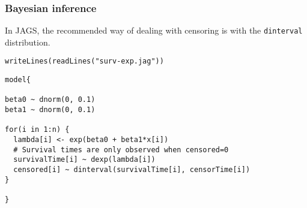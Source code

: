 \documentclass[color=usenames,dvipsnames]{beamer}\usepackage[]{graphicx}\usepackage[]{color}
\makeatletter
\newcommand{\hlstr}[1]{\textcolor[rgb]{0.749,0.012,0.012}{#1}}%
\newcommand{\hlstd}[1]{\textcolor[rgb]{0,0,0}{#1}}%
\newcommand{\hlkwd}[1]{\textcolor[rgb]{0.004,0.004,0.506}{#1}}%
\newenvironment{kframe}{%
 \def\at@end@of@kframe{}%
 \ifinner\ifhmode%
  \def\at@end@of@kframe{\end{minipage}}%
  \begin{minipage}{\columnwidth}%
 \fi\fi%
 \def\FrameCommand##1{\hskip\@totalleftmargin \hskip-\fboxsep
 \colorbox{shadecolor}{##1}\hskip-\fboxsep
     \hskip-\linewidth \hskip-\@totalleftmargin \hskip\columnwidth}%
 \MakeFramed {\advance\hsize-\width
   \@totalleftmargin\z@ \linewidth\hsize
   \@setminipage}}%
 {\par\unskip\endMakeFramed%
 \at@end@of@kframe}
\newenvironment{knitrout}{}{} %
\newcommand{\inr}[1]{\colorbox{inlinecolor}{\texttt{#1}}}
\makeatother
\begin{document}
\begin{frame}[fragile]
  \frametitle{Bayesian inference}
  In JAGS, the recommended way of dealing with censoring is with the
  \inr{dinterval} distribution. 
\begin{knitrout}
\color{fgcolor}\begin{kframe}
\begin{alltt}
\hlkwd{writeLines}\hlstd{(}\hlkwd{readLines}\hlstd{(}\hlstr{"surv-exp.jag"}\hlstd{))}
\end{alltt}
\end{kframe}
\end{knitrout}
\begin{knitrout}\footnotesize
{}\color{fgcolor}\begin{kframe}
\begin{verbatim}
model{

beta0 ~ dnorm(0, 0.1)
beta1 ~ dnorm(0, 0.1)

for(i in 1:n) {
  lambda[i] <- exp(beta0 + beta1*x[i])
  # Survival times are only observed when censored=0 
  survivalTime[i] ~ dexp(lambda[i])
  censored[i] ~ dinterval(survivalTime[i], censorTime[i])
}

}
\end{verbatim}
\end{kframe}
\end{knitrout}
\end{frame}
\end{document}
